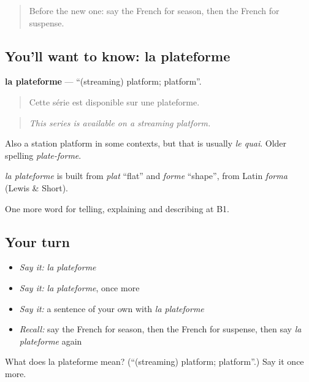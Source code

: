 \begin{quote}
Before the new one: say the French for season, then the French for suspense.
\end{quote}

\subsection*{You'll want to know: la plateforme}
\textbf{la plateforme} — \textquotedblleft{}(streaming) platform; platform\textquotedblright{}.

\begin{quote}
Cette série est disponible sur une plateforme.
\end{quote}

\begin{quote}
\emph{This series is available on a streaming platform.}
\end{quote}

Also a station platform in some contexts, but that is usually \emph{le quai}. Older spelling \emph{plate-forme}.

\begin{cousinweb}
\emph{la plateforme} is built from \emph{plat} \textquotedblleft{}flat\textquotedblright{} and \emph{forme} \textquotedblleft{}shape\textquotedblright{}, from Latin \emph{forma} (Lewis \& Short).
\end{cousinweb}

\begin{grammarlens}[title={What you've built}]
One more word for telling, explaining and describing at B1.
\end{grammarlens}

\subsection*{Your turn}
\begin{itemize}
\raggedright
  \item \emph{Say it:} \emph{la plateforme}
  \item \emph{Say it:} \emph{la plateforme}, once more
  \item \emph{Say it:} a sentence of your own with \emph{la plateforme}
  \item \emph{Recall:} say the French for season, then the French for suspense, then say \emph{la plateforme} again
\end{itemize}

\begin{tcolorbox}[breakable,colback=teal!4,colframe=teal!35!black,title={Before you move on}]
What does la plateforme mean? (\textquotedblleft{}(streaming) platform; platform\textquotedblright{}.) Say it once more.
\end{tcolorbox}
